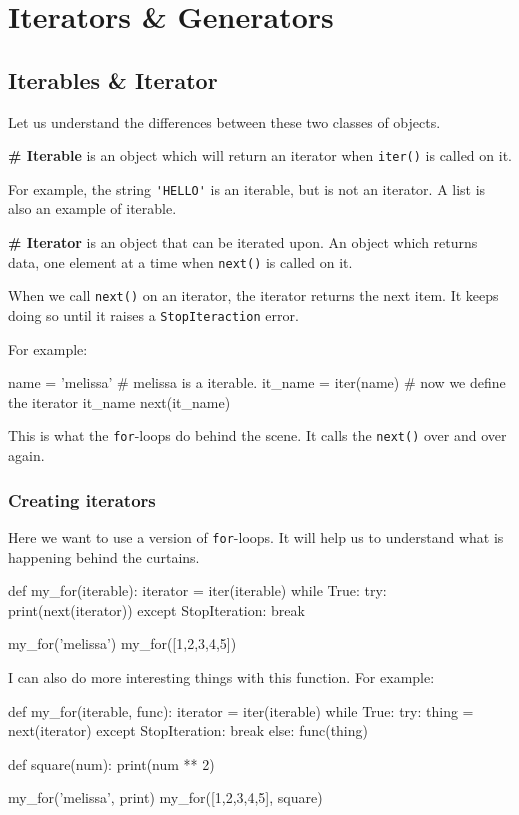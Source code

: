 \section{Iterators \& Generators}

\subsection{Iterables \& Iterator} Let us understand the differences between these two classes of objects.

{\bf \# Iterable} is an object which will return an iterator when \verb|iter()| is called on it.

For example, the string \verb|'HELLO'| is an iterable, but is not an iterator. A list is also an example of iterable. 

{\bf \# Iterator} is an object that can be iterated upon. An object which returns data, one element at a time when \verb|next()| is called on it. 

When we call \verb|next()| on an iterator, the iterator returns the next item. It keeps doing so until it raises a \verb|StopIteraction| error.

For example:   
\begin{listing}{1}
name = 'melissa' # melissa is a iterable.
it_name = iter(name) # now we define the iterator it_name 
next(it_name)
\end{listing}
This is what the \verb|for|-loops do behind the scene. It calls the \verb|next()| over and over again.

\subsubsection{Creating iterators}

Here we want to use a version of \verb|for|-loops. It will help us to understand what is happening behind the curtains. 
\begin{listing}{1}
def my_for(iterable):
iterator = iter(iterable)
while True:
    try:
        print(next(iterator))
    except StopIteration:
        break

my_for('melissa')
my_for([1,2,3,4,5]) 
\end{listing}

I can also do more interesting things with this function. For example:
\begin{listing}{1}
def my_for(iterable, func):
    iterator = iter(iterable)
    while True:
        try:
            thing = next(iterator)
        except StopIteration:
            break
        else:
            func(thing)

def square(num):            
    print(num ** 2)

my_for('melissa', print)
my_for([1,2,3,4,5], square)  
\end{listing}

